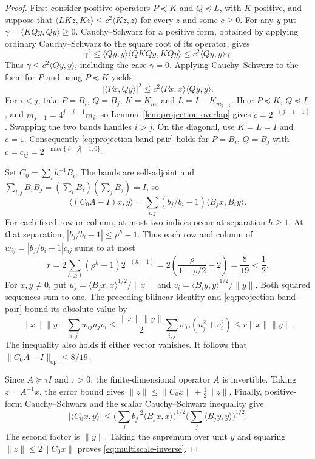 \documentclass[11pt]{article}
\theoremstyle{definition}\newtheorem{definition}[theorem]{Definition}
\begin{document}
\begin{proof}
First consider positive operators $P\preceq K$ and $Q\preceq L$, with
$K$ positive, and suppose that
$\langle L Kz,Kz\rangle\leq c^2\langle Kz,z\rangle$ for every $z$ and some
$c\geq0$. For any $y$ put $\gamma=\langle KQy,Qy\rangle\geq0$.
Cauchy--Schwarz for a positive form, obtained by applying ordinary
Cauchy--Schwarz to the square root of its operator, gives
\[
  \gamma^2\leq\langle Qy,y\rangle\langle QKQy,KQy\rangle
  \leq c^2\langle Qy,y\rangle\gamma.
\]
Thus $\gamma\leq c^2\langle Qy,y\rangle$, including the case $\gamma=0$.
Applying Cauchy--Schwarz to the form for $P$ and using $P\preceq K$ yields
\begin{equation}
  \label{eq:projection-band-pair}
  |\langle Px,Qy\rangle|^2
  \leq c^2\langle Px,x\rangle\langle Qy,y\rangle.
\end{equation}
For $i<j$, take $P=B_i$, $Q=B_j$, $K=K_{m_i}$ and
$L=I-K_{m_{j-1}}$. Here $P\preceq K$, $Q\preceq L$, and
$m_{j-1}=4^{j-i-1}m_i$, so Lemma~\ref{lem:projection-overlap} gives
$c=2^{-(j-i-1)}$. Swapping the two bands handles $i>j$.
On the diagonal, use $K=L=I$ and $c=1$. Consequently
\eqref{eq:projection-band-pair} holds for $P=B_i$, $Q=B_j$ with
$c=c_{ij}=2^{-\max\{|i-j|-1,0\}}$.

Set $C_0=\sum_i b_i^{-1}B_i$. The bands are self-adjoint and
$\sum_{i,j}B_iB_j=(\sum_iB_i)(\sum_jB_j)=I$, so
\[
  \langle(C_0A-I)x,y\rangle
  =\sum_{i,j}(b_j/b_i-1)\langle B_jx,B_iy\rangle.
\]
For each fixed row or column, at most two indices occur at separation
$h\geq1$. At that separation,
$|b_j/b_i-1|\leq\rho^h-1$. Thus each row and column of
$w_{ij}=|b_j/b_i-1|c_{ij}$ sums to at most
\[
  r=2\sum_{h\geq1}(\rho^h-1)2^{-(h-1)}
   =2\left(\frac{\rho}{1-\rho/2}-2\right)
   =\frac{8}{19}<\frac12.
\]
For $x,y\ne0$, put
$u_j=\langle B_jx,x\rangle^{1/2}/\|x\|$ and
$v_i=\langle B_iy,y\rangle^{1/2}/\|y\|$. Both squared sequences sum to
one. The preceding bilinear identity and \eqref{eq:projection-band-pair}
bound its absolute value by
\[
  \|x\|\|y\|\sum_{i,j}w_{ij}u_jv_i
  \leq \frac{\|x\|\|y\|}{2}\sum_{i,j}w_{ij}(u_j^2+v_i^2)
  \leq r\|x\|\|y\|.
\]
The inequality also holds if either vector vanishes. It follows that
$\|C_0A-I\|_{\mathrm{op}}\leq 8/19$.

Since $A\succeq\tau I$ and $\tau>0$, the finite-dimensional operator
$A$ is invertible. Taking $z=A^{-1}x$, the error bound gives
$\|z\|\leq\|C_0x\|+\tfrac12\|z\|$. Finally, positive-form Cauchy--Schwarz
and the scalar Cauchy--Schwarz inequality give
\[
  |\langle C_0x,y\rangle|
  \leq
  \Big(\sum_j b_j^{-2}\langle B_jx,x\rangle\Big)^{1/2}
  \Big(\sum_j\langle B_jy,y\rangle\Big)^{1/2}.
\]
The second factor is $\|y\|$. Taking the supremum over unit $y$ and
squaring $\|z\|\leq2\|C_0x\|$ proves \eqref{eq:multiscale-inverse}.
\end{proof}
\end{document}
